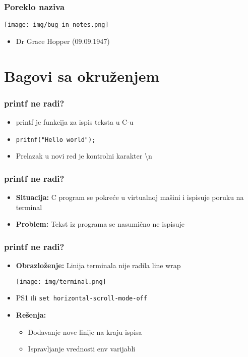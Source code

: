 \documentclass{beamer}
\begin{document}
\begin{frame}
    \frametitle{Poreklo naziva}
    \begin{center}
        \texttt{[image: img/bug\_in\_notes.png]}
    \end{center}
    \begin{itemize}
        \item Dr Grace Hopper (09.09.1947)
    \end{itemize}
\end{frame}

\section{Bagovi sa okruženjem}

\begin{frame}
\frametitle{printf ne radi?}
\begin{itemize}
    \item printf je funkcija za ispis teksta u C-u \newline
    \item \lstinline|pritnf("Hello world");| \newline
    \item Prelazak u novi red je kontrolni karakter \textbackslash n
\end{itemize}
\end{frame}

\begin{frame}
\frametitle{printf ne radi?}
\begin{itemize}
    \item \textbf{Situacija:} C program se pokreće u virtualnoj mašini i ispisuje poruku na terminal \newline
    \item \textbf{Problem:} Tekst iz programa se nasumično ne ispisuje
\end{itemize}
\end{frame}

\begin{frame}
\frametitle{printf ne radi?}
\begin{itemize}
    \item \textbf{Obrazloženje:} Linija terminala nije radila line wrap \newline
    \begin{center}
        \texttt{[image: img/terminal.png]}
    \end{center}
    \item PS1 ili \lstinline|set horizontal-scroll-mode-off| \newline
    \item \textbf{Rešenja: }
    \begin{itemize}
        \item Dodavanje nove linije na kraju ispisa \newline
        \item Ispravljanje vrednosti env varijabli \newline
    \end{itemize}  
    
\end{itemize}
\end{frame}
\end{document}
